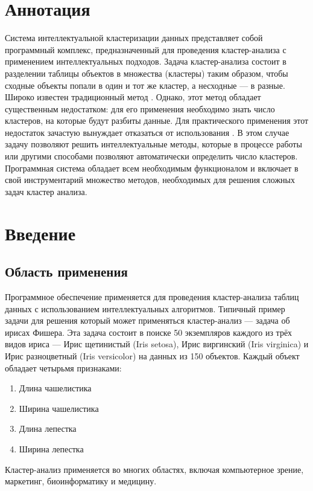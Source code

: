 \documentclass[12pt,tikz]{instruction}
\begin{document}
\section*{Аннотация}
Система интеллектуальной кластеризации данных \SysName представляет собой программный комплекс, предназначенный для проведения кластер-анализа с применением интеллектуальных подходов. Задача кластер-анализа состоит в разделении таблицы объектов в множества (кластеры) таким образом, чтобы сходные объекты попали в один и тот же кластер, а несходные --- в разные. Широко известен традиционный метод \kmeans. Однако, этот метод обладает существенным недостатком: для его применения необходимо знать число кластеров, на которые будут разбиты данные. Для практического применения этот недостаток зачастую вынуждает отказаться от использования \kmeans. В этом случае задачу позволяют решить интеллектуальные методы, которые в процессе работы или другими способами позволяют автоматически определить число кластеров. Программная система \SysName обладает всем необходимым функционалом и включает в свой инструментарий множество методов, необходимых для решения сложных задач кластер анализа.
\newpage
	
\tableofcontents 

\newpage
\section{Введение}
\subsection{Область применения} 

Программное обеспечение \SysName применяется для проведения кластер-анализа таблиц данных с использованием интеллектуальных алгоритмов. Типичный пример задачи для решения который может применяться кластер-анализ --- задача об ирисах Фишера. Эта задача состоит в поиске 50 экземпляров каждого из трёх видов ириса --- Ирис щетинистый (Iris setosa), Ирис виргинский (Iris virginica) и Ирис разноцветный (Iris versicolor) на данных из 150 объектов. Каждый объект обладает четырьмя признаками: 
\begin{enumerate}
	\item Длина чашелистика
	\item Ширина чашелистика
	\item Длина лепестка
	\item Ширина лепестка
\end{enumerate}
Кластер-анализ применяется во многих областях, включая компьютерное зрение, маркетинг, биоинформатику и медицину\cite{amorim}.
\end{document}
